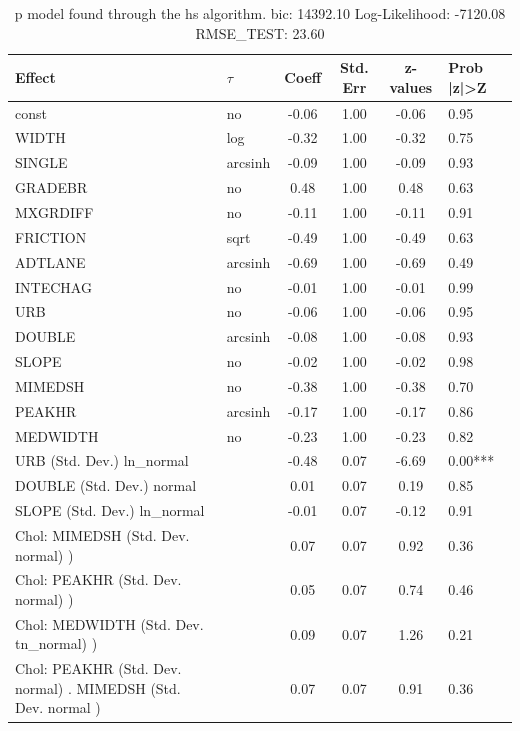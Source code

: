 \begin{table}
	\caption{p model found through the hs algorithm. bic: 14392.10 Log-Likelihood: -7120.08 RMSE_TEST: 23.60}
	\begin{center}
		\begin{tabular}{|l|l|c|c|c|l|}
			\hline
			Effect & $\tau$ & Coeff & Std. Err & z-values & Prob |z|>Z \\
			\hline
			const & no & -0.06 & 1.00 & -0.06 & 0.95 \\
			\hline
			WIDTH & log & -0.32 & 1.00 & -0.32 & 0.75 \\
			\hline
			SINGLE & arcsinh & -0.09 & 1.00 & -0.09 & 0.93 \\
			\hline
			GRADEBR & no & 0.48 & 1.00 & 0.48 & 0.63 \\
			\hline
			MXGRDIFF & no & -0.11 & 1.00 & -0.11 & 0.91 \\
			\hline
			FRICTION & sqrt & -0.49 & 1.00 & -0.49 & 0.63 \\
			\hline
			ADTLANE & arcsinh & -0.69 & 1.00 & -0.69 & 0.49 \\
			\hline
			INTECHAG & no & -0.01 & 1.00 & -0.01 & 0.99 \\
			\hline
			URB & no & -0.06 & 1.00 & -0.06 & 0.95 \\
			\hline
			DOUBLE & arcsinh & -0.08 & 1.00 & -0.08 & 0.93 \\
			\hline
			SLOPE & no & -0.02 & 1.00 & -0.02 & 0.98 \\
			\hline
			MIMEDSH & no & -0.38 & 1.00 & -0.38 & 0.70 \\
			\hline
			PEAKHR & arcsinh & -0.17 & 1.00 & -0.17 & 0.86 \\
			\hline
			MEDWIDTH & no & -0.23 & 1.00 & -0.23 & 0.82 \\
			\hline
			URB (Std. Dev.) ln_normal &  & -0.48 & 0.07 & -6.69 & 0.00*** \\
			\hline
			DOUBLE (Std. Dev.) normal &  & 0.01 & 0.07 & 0.19 & 0.85 \\
			\hline
			SLOPE (Std. Dev.) ln_normal &  & -0.01 & 0.07 & -0.12 & 0.91 \\
			\hline
			 Chol: MIMEDSH (Std. Dev. normal) ) &  & 0.07 & 0.07 & 0.92 & 0.36 \\
			\hline
			 Chol: PEAKHR (Std. Dev. normal) ) &  & 0.05 & 0.07 & 0.74 & 0.46 \\
			\hline
			 Chol: MEDWIDTH (Std. Dev. tn_normal) ) &  & 0.09 & 0.07 & 1.26 & 0.21 \\
			\hline
			 Chol: PEAKHR (Std. Dev. normal) . MIMEDSH (Std. Dev.   normal ) &  & 0.07 & 0.07 & 0.91 & 0.36 \\

\end{tabular}
\end{center}
\end{table}
